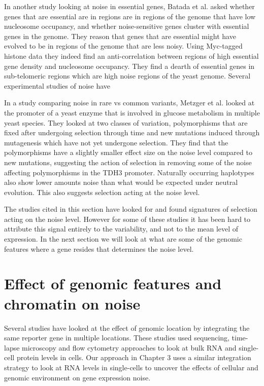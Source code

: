 In another study looking at noise in essential genes, Batada et al. \cite{batada2007ng} asked whether genes that are essential are in regions are in regions of the genome that have low nucleosome occupancy, and whether noise-sensitive genes cluster with essential genes in the genome. They reason that genes that are essential might have evolved to be in regions of the genome that are less noisy. Using Myc-tagged histone data they indeed find an anti-correlation between regions of high essential gene density and nucleosome occupancy. They find a dearth of essential genes in sub-telomeric regions which are high noise regions of the yeast genome. Several experimental studies of noise have 

In a study comparing noise in rare vs common variants, Metzger et al. \cite{metzger2015n} looked at the promoter of a yeast enzyme that is involved in glucose metabolism in multiple yeast species. They looked at two classes of variation, polymorphisms that are fixed after undergoing selection through time and new mutations induced through mutagenesis which have not yet undergone selection. They find that the polymorphisms have a slightly smaller effect size on the noise level compared to new mutations, suggesting the action of selection in removing some of the noise affecting polymorphisms in the TDH3 promoter. Naturally occurring haplotypes also show lower amounts noise than what would be expected under neutral evolution. This also suggests selection acting at the noise level.

The studies cited in this section have looked for and found signatures of selection acting on the noise level. However for some of these studies it has been hard to attribute this signal entirely to the variability, and not to the mean level of expression. In the next section we will look at what are some of the genomic features where a gene resides that determines the noise level.

\section{Effect of genomic features and chromatin on noise}

Several studies have looked at the effect of genomic location by integrating the same reporter gene in multiple locations. These studies used sequencing, time-lapse microscopy and flow cytometry approaches to look at bulk RNA and single-cell protein levels in cells. Our approach in Chapter 3 uses a similar integration strategy to look at RNA levels in single-cells to uncover the effects of cellular and genomic environment on gene expression noise.

